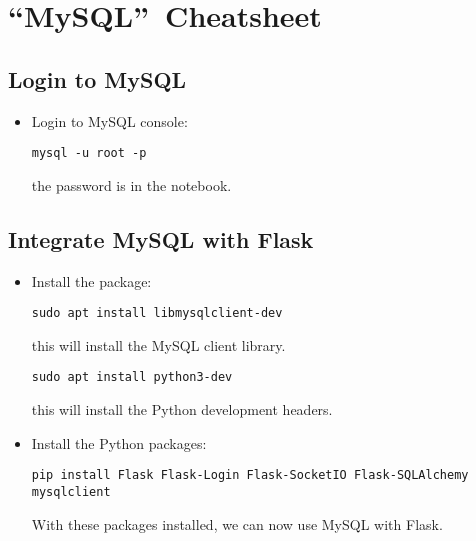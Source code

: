 \section{\textquotedblleft MySQL\textquotedblright\ Cheatsheet}

%

\subsection{Login to MySQL}

\begin{itemize}
    \item Login to MySQL console:
    \begin{verbatim}
mysql -u root -p
    \end{verbatim}
    the password is in the notebook.
\end{itemize}

\subsection{Integrate MySQL with Flask}

\begin{itemize}
    \item Install the package:
    \begin{verbatim}
sudo apt install libmysqlclient-dev
    \end{verbatim}
    this will install the MySQL client library.
    \begin{verbatim}
sudo apt install python3-dev
    \end{verbatim}
    this will install the Python development headers.
    \item Install the Python packages:
    \begin{verbatim}
pip install Flask Flask-Login Flask-SocketIO Flask-SQLAlchemy mysqlclient
    \end{verbatim}
    With these packages installed, we can now use MySQL with Flask.
\end{itemize}
